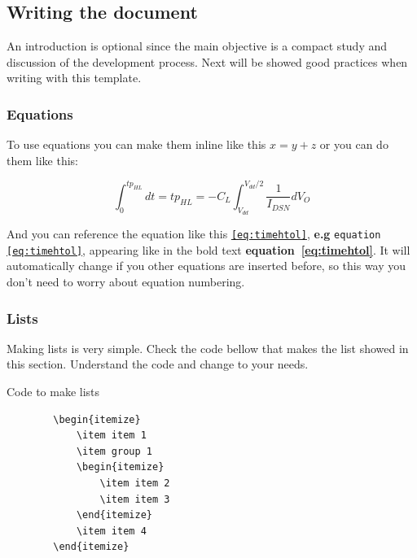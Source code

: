 \documentclass[]{engenius}
\begin{document}
\subsection{Writing the document}

An introduction is optional since the main objective is a compact study and discussion of the development process.
Next will be showed good practices when writing with this template.

\subsubsection{Equations}

To use equations you can make them inline like this $x = y + z$ or you can do them like this:

\begin{equation}\label{eq:timehtol}
    \int_{0}^{tp_{HL}}dt = tp_{HL} = -C_L \int_{V_{dd}}^{V_{dd}/2}\frac{1}{I_{DSN}} dV_O
\end{equation}

And you can reference the equation like this \texttt{\ref{eq:timehtol}}, \textbf{e.g} \texttt{equation \ref{eq:timehtol}}, appearing like in the bold text \textbf{equation~\ref{eq:timehtol}}. It will automatically change if you other equations are inserted before, so this way you don't need to worry about equation numbering.

\subsubsection{Lists}

Making lists is very simple. Check the code bellow that makes the list showed in this section. Understand the code and change to your needs.

\begin{codebox}{Code to make lists}
    \begin{verbatim}
        \begin{itemize}
            \item item 1
            \item group 1
            \begin{itemize}
                \item item 2
                \item item 3
            \end{itemize}
            \item item 4
        \end{itemize}
    \end{verbatim}
\end{codebox}
\end{document}
